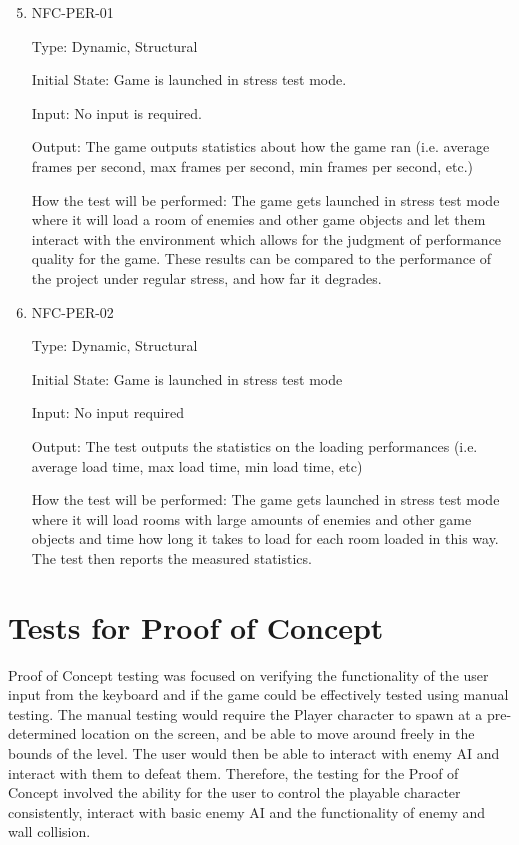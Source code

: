 \documentclass[12pt, titlepage]{article}
\begin{document}
\begin{enumerate}
	\setcounter{enumi}{4}	
	
	\item{NFC-PER-01\\}
	
	Type: Dynamic, Structural
	
	Initial State: Game is launched in stress test mode.
	
	Input: No input is required.
	
	Output: The game outputs statistics about how the game ran (i.e. average frames per second, max frames per second, min frames per second, etc.)
	
	How the test will be performed: The game gets launched in stress test mode where it will load a room of enemies and other game objects and let them interact with the environment which allows for the judgment of performance quality for the game. These results can be compared to the performance of the project under regular stress, and how far it degrades.
	
	\item{NFC-PER-02\\}
	
	Type: Dynamic, Structural
	
	Initial State: Game is launched in stress test mode
	
	Input: No input required
	
	Output: The test outputs the statistics on the loading performances (i.e. average load time, max load time, min load time, etc)
	
	How the test will be performed: The game gets launched in stress test mode where it will load rooms with large amounts of enemies and other game objects and time how long it takes to load for each room loaded in this way. The test then reports the measured statistics.
	
\end{enumerate}

\section{Tests for Proof of Concept}
Proof of Concept testing was focused on verifying the functionality of the user input from the keyboard and if the game could be effectively tested using manual testing. The manual testing would require the Player character to spawn at a pre-determined location on the screen, and be able to move around freely in the bounds of the level. The user would then be able to interact with enemy AI and interact with them to defeat them. Therefore, the testing for the Proof of Concept involved the ability for the user to control the playable character consistently, interact with basic enemy AI and the functionality of enemy and wall collision.
\end{document}
